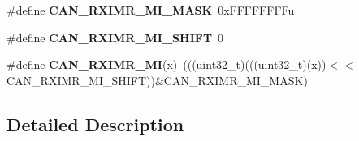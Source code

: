 \begin{DoxyCompactItemize}
\item 
\#define {\bfseries C\+A\+N\+\_\+\+R\+X\+I\+M\+R\+\_\+\+M\+I\+\_\+\+M\+A\+SK}~0x\+F\+F\+F\+F\+F\+F\+F\+Fu\hypertarget{group__CAN__Register__Masks_ga3cef91282e43c8e5d2c30e65d375f964}{}\label{group__CAN__Register__Masks_ga3cef91282e43c8e5d2c30e65d375f964}

\item 
\#define {\bfseries C\+A\+N\+\_\+\+R\+X\+I\+M\+R\+\_\+\+M\+I\+\_\+\+S\+H\+I\+FT}~0\hypertarget{group__CAN__Register__Masks_gae3dd7acc84e521ca0a05beb33f7b434c}{}\label{group__CAN__Register__Masks_gae3dd7acc84e521ca0a05beb33f7b434c}

\item 
\#define {\bfseries C\+A\+N\+\_\+\+R\+X\+I\+M\+R\+\_\+\+MI}(x)~(((uint32\+\_\+t)(((uint32\+\_\+t)(x))$<$$<$C\+A\+N\+\_\+\+R\+X\+I\+M\+R\+\_\+\+M\+I\+\_\+\+S\+H\+I\+FT))\&C\+A\+N\+\_\+\+R\+X\+I\+M\+R\+\_\+\+M\+I\+\_\+\+M\+A\+SK)\hypertarget{group__CAN__Register__Masks_gae80c7ae8e847975c034fb39476b6a840}{}\label{group__CAN__Register__Masks_gae80c7ae8e847975c034fb39476b6a840}

\end{DoxyCompactItemize}


\subsection{Detailed Description}
